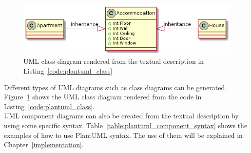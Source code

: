 \begin{figure}[H]
\centering
\captionsetup{justification=centering}
\vspace{0cm}%
\includegraphics[width=0.8\linewidth]{figure/misc/plantuml_class.png}
\caption{UML class diagram rendered from the textual description in Listing~\ref{code:plantuml_class}}
\label{fig:plantuml_class}
\end{figure}

Different types of UML diagrams such as class diagrams can be generated. Figure~\ref{fig:plantuml_class} shows the UML class diagram rendered from the code in Listing~\ref{code:plantuml_class}.\\

UML component diagrams can also be created from the textual description by using some specific syntax. Table~\ref{table:plantuml_component_syntax} shows the examples of how to use PlantUML syntax. The use of them will be explained in Chapter~\ref{implementation}. 


